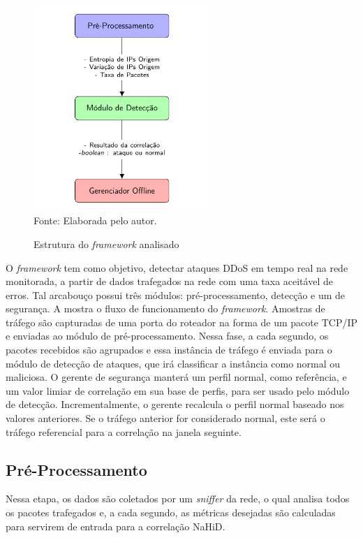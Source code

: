  \begin{figure}[htb]
	\centering
	\caption{Estrutura do \textit{framework} analisado }
	\includegraphics[width=0.6\textwidth]{figs/fluxoFramework.pdf}\\
	{Fonte: Elaborada pelo autor.}
	\label{fig:Fluxo_Framework}
\end{figure}

O \textit{framework} tem como objetivo, detectar ataques DDoS em tempo real na rede monitorada, a partir de dados trafegados na rede com uma taxa aceitável de erros. Tal arcabouço possui três módulos: pré-processamento, detecção e um de segurança. A  mostra o fluxo de funcionamento do \textit{framework}. Amostras de tráfego são capturadas de uma porta do roteador na forma de um pacote TCP/IP e enviadas ao módulo de pré-processamento. Nessa fase, a cada segundo, os pacotes recebidos são agrupados e essa instância de tráfego é enviada para o módulo de detecção de ataques, que irá classificar a instância como normal ou maliciosa. O gerente de segurança manterá um perfil normal, como referência, e um valor limiar de correlação em sua base de perfis, para ser usado pelo módulo de detecção. Incrementalmente, o gerente recalcula o perfil normal baseado nos valores anteriores. Se o tráfego anterior for considerado normal, este será o tráfego referencial para a correlação na janela seguinte.

\subsection{Pré-Processamento}
Nessa etapa, os dados são coletados por um \textit{sniffer} da rede, o qual analisa todos os pacotes trafegados e, a cada segundo, as métricas desejadas são calculadas para servirem de entrada para a correlação NaHiD. 
